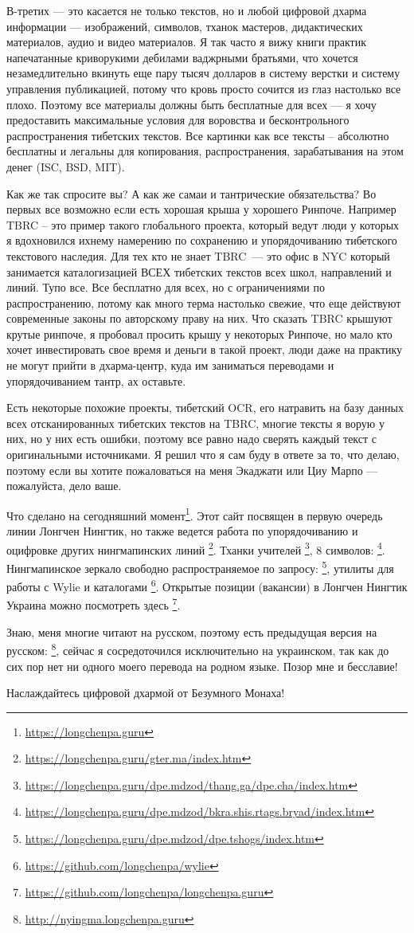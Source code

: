 В-третих — это касается не только текстов, но и любой цифровой дхарма информации — изображений, символов, тханок мастеров, дидактических материалов, аудио и видео материалов. Я так часто я вижу книги практик напечатанные криворукими дебилами ваджрными братьями, что хочется незамедлительно вкинуть еще пару тысяч долларов в систему верстки и систему управления публикацией, потому что кровь просто сочится из глаз настолько все плохо. Поэтому все материалы должны быть бесплатные для всех — я хочу предоставить максимальные условия для воровства и бесконтрольного распространения тибетских текстов. Все картинки как все тексты – абсолютно бесплатны и легальны для копирования, распространения, зарабатывания на этом денег (ISC, BSD, MIT).

Как же так спросите вы? А как же самаи и тантрические обязательства? Во первых все возможно если есть хорошая крыша у хорошего Ринпоче. Например TBRC – это пример такого глобального проекта, который ведут люди у которых я вдохновился ихнему намерению по сохранению и упорядочиванию тибетского текстового наследия. Для тех кто не знает TBRC — это офис в NYC который занимается каталогизацией ВСЕХ тибетских текстов всех школ, направлений и линий. Тупо все. Все бесплатно для всех, но с ограничениями по распространению, потому как много терма настолько свежие, что еще действуют современные законы по авторскому праву на них. Что сказать TBRC крышуют крутые ринпоче, я пробовал просить крышу у некоторых Ринпоче, но мало кто хочет инвестировать свое время и деньги в такой проект, люди даже на практику не могут прийти в дхарма-центр, куда им заниматься переводами и упорядочиванием тантр, ах оставьте.

Есть некоторые похожие проекты, тибетский OCR,
его натравить на базу данных всех отсканированных
тибетских текстов на TBRC, многие тексты я ворую
у них, но у них есть ошибки, поэтому все равно
надо сверять каждый текст с оригинальными источниками.
Я решил что я сам буду в ответе за то, что делаю,
поэтому если вы хотите пожаловаться на меня Экаджати
или Циу Марпо --- пожалуйста, дело ваше.

Что сделано на сегодняшний момент\footnote{\url{https://longchenpa.guru}}.
Этот сайт посвящен в первую очередь линии Лонгчен Нингтик,
но также ведется работа по упорядочиванию и оцифровке других
нингмапинских линий \footnote{\url{https://longchenpa.guru/gter.ma/index.htm}}.
Тханки учителей \footnote{\url{https://longchenpa.guru/dpe.mdzod/thang.ga/dpe.cha/index.htm}},
8 символов: \footnote{\url{https://longchenpa.guru/dpe.mdzod/bkra.shis.rtags.bryad/index.htm}}.
Нингмапинское зеркало свободно распространяемое по
запросу: \footnote{\url{https://longchenpa.guru/dpe.mdzod/dpe.tshogs/index.htm}},
утилиты для работы с Wylie и каталогами \footnote{\url{https://github.com/longchenpa/wylie}}.
Открытые позиции (вакансии) в Лонгчен Нингтик Украина
можно посмотреть здесь \footnote{\url{https://github.com/longchenpa/longchenpa.guru}}.

Знаю, меня многие читают на русском, поэтому есть
предыдущая версия на русском: \footnote{\url{http://nyingma.longchenpa.guru}},
сейчас я сосредоточился исключительно на украинском, так
как до сих пор нет ни одного моего перевода на родном языке.
Позор мне и бесславие!

Наслаждайтесь цифровой дхармой от Безумного Монаха!
